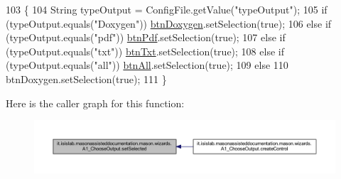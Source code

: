 \begin{DoxyCode}
103                                \{
104         String typeOutput = ConfigFile.getValue(\textcolor{stringliteral}{"typeOutput"});
105         \textcolor{keywordflow}{if} (typeOutput.equals(\textcolor{stringliteral}{"Doxygen"}))   \hyperlink{classit_1_1isislab_1_1masonassisteddocumentation_1_1mason_1_1wizards_1_1_a1___choose_output_a64285d7a7afd8d13b8da8dfc76d8c524}{btnDoxygen}.setSelection(\textcolor{keyword}{true});
106         \textcolor{keywordflow}{else} \textcolor{keywordflow}{if} (typeOutput.equals(\textcolor{stringliteral}{"pdf"}))  \hyperlink{classit_1_1isislab_1_1masonassisteddocumentation_1_1mason_1_1wizards_1_1_a1___choose_output_a9b810d24e36dd0e722f76a0f0a9b064b}{btnPdf}.setSelection(\textcolor{keyword}{true});
107         \textcolor{keywordflow}{else} \textcolor{keywordflow}{if} (typeOutput.equals(\textcolor{stringliteral}{"txt"}))  \hyperlink{classit_1_1isislab_1_1masonassisteddocumentation_1_1mason_1_1wizards_1_1_a1___choose_output_a7a3e59d93bfba5d422c70ffdaf34f8ae}{btnTxt}.setSelection(\textcolor{keyword}{true});
108         \textcolor{keywordflow}{else} \textcolor{keywordflow}{if} (typeOutput.equals(\textcolor{stringliteral}{"all"}))  \hyperlink{classit_1_1isislab_1_1masonassisteddocumentation_1_1mason_1_1wizards_1_1_a1___choose_output_aebfe811a15807a6648df6d7cb9ce1196}{btnAll}.setSelection(\textcolor{keyword}{true});
109         \textcolor{keywordflow}{else}
110             btnDoxygen.setSelection(\textcolor{keyword}{true});
111     \}
\end{DoxyCode}


Here is the caller graph for this function\-:
\nopagebreak
\begin{figure}[H]
\begin{center}
\leavevmode
\includegraphics[width=350pt]{classit_1_1isislab_1_1masonassisteddocumentation_1_1mason_1_1wizards_1_1_a1___choose_output_a4602f301eef9ed9fbb73ef78b00ae401_icgraph}
\end{center}
\end{figure}




